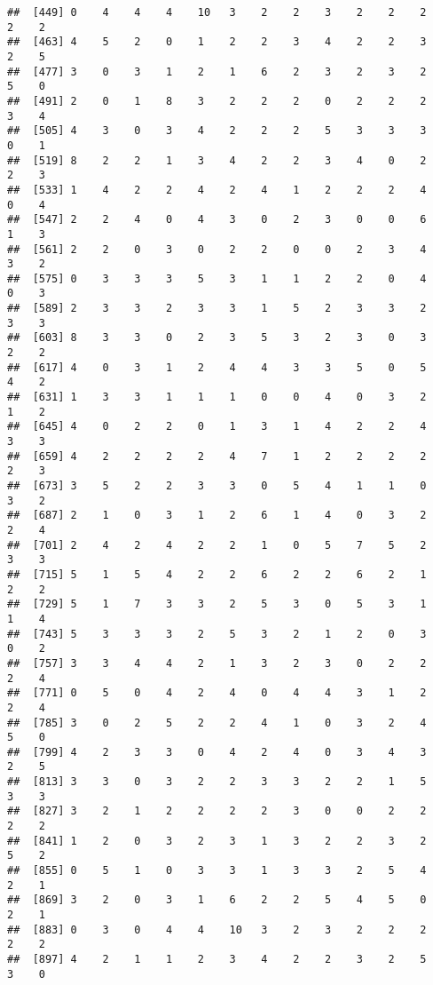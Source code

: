 \documentclass[
]{article}
\begin{document}
\begin{verbatim}
##  [449] 0    4    4    4    10   3    2    2    3    2    2    2    2    2   
##  [463] 4    5    2    0    1    2    2    3    4    2    2    3    2    5   
##  [477] 3    0    3    1    2    1    6    2    3    2    3    2    5    0   
##  [491] 2    0    1    8    3    2    2    2    0    2    2    2    3    4   
##  [505] 4    3    0    3    4    2    2    2    5    3    3    3    0    1   
##  [519] 8    2    2    1    3    4    2    2    3    4    0    2    2    3   
##  [533] 1    4    2    2    4    2    4    1    2    2    2    4    0    4   
##  [547] 2    2    4    0    4    3    0    2    3    0    0    6    1    3   
##  [561] 2    2    0    3    0    2    2    0    0    2    3    4    3    2   
##  [575] 0    3    3    3    5    3    1    1    2    2    0    4    0    3   
##  [589] 2    3    3    2    3    3    1    5    2    3    3    2    3    3   
##  [603] 8    3    3    0    2    3    5    3    2    3    0    3    2    2   
##  [617] 4    0    3    1    2    4    4    3    3    5    0    5    4    2   
##  [631] 1    3    3    1    1    1    0    0    4    0    3    2    1    2   
##  [645] 4    0    2    2    0    1    3    1    4    2    2    4    3    3   
##  [659] 4    2    2    2    2    4    7    1    2    2    2    2    2    3   
##  [673] 3    5    2    2    3    3    0    5    4    1    1    0    3    2   
##  [687] 2    1    0    3    1    2    6    1    4    0    3    2    2    4   
##  [701] 2    4    2    4    2    2    1    0    5    7    5    2    3    3   
##  [715] 5    1    5    4    2    2    6    2    2    6    2    1    2    2   
##  [729] 5    1    7    3    3    2    5    3    0    5    3    1    1    4   
##  [743] 5    3    3    3    2    5    3    2    1    2    0    3    0    2   
##  [757] 3    3    4    4    2    1    3    2    3    0    2    2    2    4   
##  [771] 0    5    0    4    2    4    0    4    4    3    1    2    2    4   
##  [785] 3    0    2    5    2    2    4    1    0    3    2    4    5    0   
##  [799] 4    2    3    3    0    4    2    4    0    3    4    3    2    5   
##  [813] 3    3    0    3    2    2    3    3    2    2    1    5    3    3   
##  [827] 3    2    1    2    2    2    2    3    0    0    2    2    2    2   
##  [841] 1    2    0    3    2    3    1    3    2    2    3    2    5    2   
##  [855] 0    5    1    0    3    3    1    3    3    2    5    4    2    1   
##  [869] 3    2    0    3    1    6    2    2    5    4    5    0    2    1   
##  [883] 0    3    0    4    4    10   3    2    3    2    2    2    2    2   
##  [897] 4    2    1    1    2    3    4    2    2    3    2    5    3    0   

\end{verbatim}
\end{document}
